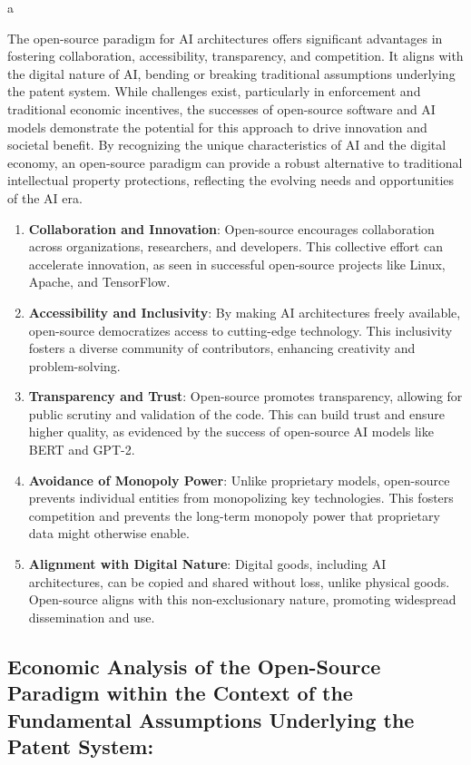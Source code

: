 a\documentclass{article}[10pt]
\begin{document}
The open-source paradigm for AI architectures offers significant advantages in fostering collaboration, accessibility, transparency, and competition. It aligns with the digital nature of AI, bending or breaking traditional assumptions underlying the patent system. While challenges exist, particularly in enforcement and traditional economic incentives, the successes of open-source software and AI models demonstrate the potential for this approach to drive innovation and societal benefit. By recognizing the unique characteristics of AI and the digital economy, an open-source paradigm can provide a robust alternative to traditional intellectual property protections, reflecting the evolving needs and opportunities of the AI era.

\begin{enumerate}
	\item \textbf{Collaboration and Innovation}: Open-source encourages collaboration across organizations, researchers, and developers. This collective effort can accelerate innovation, as seen in successful open-source projects like Linux, Apache, and TensorFlow.
	\item \textbf{Accessibility and Inclusivity}: By making AI architectures freely available, open-source democratizes access to cutting-edge technology. This inclusivity fosters a diverse community of contributors, enhancing creativity and problem-solving.
	\item \textbf{Transparency and Trust}: Open-source promotes transparency, allowing for public scrutiny and validation of the code. This can build trust and ensure higher quality, as evidenced by the success of open-source AI models like BERT and GPT-2.
	\item \textbf{Avoidance of Monopoly Power}: Unlike proprietary models, open-source prevents individual entities from monopolizing key technologies. This fosters competition and prevents the long-term monopoly power that proprietary data might otherwise enable.
	\item \textbf{Alignment with Digital Nature}: Digital goods, including AI architectures, can be copied and shared without loss, unlike physical goods. Open-source aligns with this non-exclusionary nature, promoting widespread dissemination and use.
\end{enumerate}

\subsection{Economic Analysis of the Open-Source Paradigm within the Context of the Fundamental Assumptions Underlying the Patent System:}
\end{document}
